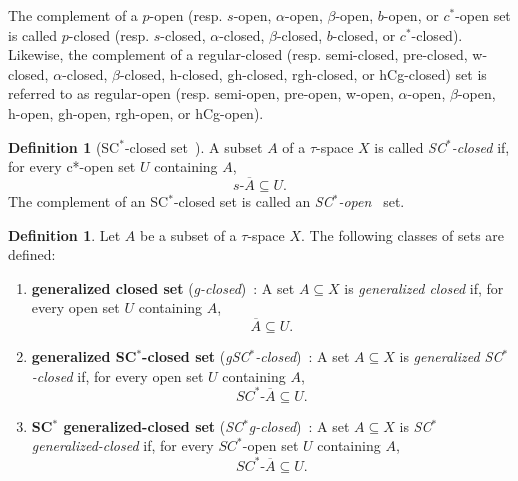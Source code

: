 \documentclass[12pt,a4paper,twoside]{report}  %
\theoremstyle{plain}
\theoremstyle{definition}
\newtheorem{definition}[theorem]{Definition}
\begin{document}
\medskip
\noindent
The complement of a \(p\)-open\cite{mashhour1982precontinuous} (resp. \(s\)-open\cite{levine1970gen}, \(\alpha\)-open\cite{njȧstad1965some}, \(\beta\)-open\cite{me1983beta}, \(b\)-open\cite{andrijevic1996b}, or \(c^*\)-open\cite{malathi2017pre} set is called \(p\)-closed\cite{mashhour1982precontinuous} (resp. \(s\)-closed\cite{levine1970gen}, \(\alpha\)-closed\cite{njȧstad1965some}, \(\beta\)-closed\cite{me1983beta}, \(b\)-closed\cite{andrijevic1996b}, or \(c^*\)-closed\cite{malathi2017pre}).\\  
    Likewise, the complement of a regular-closed\cite{stone1937applications} (resp. semi-closed, pre-closed, w-closed, \(\alpha\)-closed, \(\beta\)-closed, h-closed, gh-closed, rgh-closed, or hCg-closed) set is referred to as regular-open\cite{stone1937applications} (resp. semi-open, pre-open, w-open, \(\alpha\)-open, \(\beta\)-open, h-open, gh-open, rgh-open, or hCg-open).



\begin{definition}[SC$^*$-closed set~\cite{chandrakala2022sc}]
A subset $A$ of a $\tau$-space $X$ is called \emph{SC$^*$-closed} if, for every c*-open\cite{malathi2017pre} set $U$ containing $A$, 
\[
s\text{-}\overline{A} \subseteq U.
\]
The complement of an SC$^*$-closed set is called an \emph{SC$^*$-open~\cite{chandrakala2022sc}} set.
\end{definition}


\begin{definition}Let \(A\) be a subset of a $\tau$-space \(X\). The following classes of sets are defined:

\begin{enumerate}[label=(\roman*)]

\item \textbf{generalized closed set} (\emph{g-closed})~\cite{levine1970gen}:  
A set \(A \subseteq X\) is \emph{generalized closed} if, for every open set \(U\) containing \(A\),
\[
\overline{A} \subseteq U.
\]

\item \textbf{generalized SC$^*$-closed set} (\emph{gSC$^*$-closed})~\cite{tomar2025sc}:  
A set \(A \subseteq X\) is \emph{generalized SC$^*$-closed} if, for every open set \(U\) containing \(A\),
\[
SC^*\text{-}\overline{A} \subseteq U.
\]

\item \textbf{SC$^*$ generalized-closed set} (\emph{SC$^*$g-closed})~\cite{tomar2025sc}:  
A set \(A \subseteq X\) is \emph{SC$^*$ generalized-closed} if, for every \(SC^*\)-open set \(U\) containing \(A\),
\[
SC^*\text{-}\overline{A} \subseteq U.
\]

\end{enumerate}
\end{definition}
\end{document}
